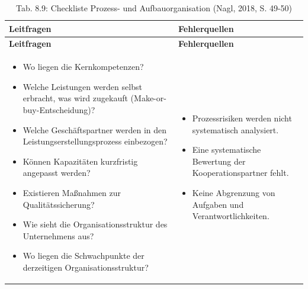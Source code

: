 \documentclass[
  letterpaper,
]{book}
\begin{document}
\begin{longtable}[]{@{}
  >{\raggedright\arraybackslash}p{}
  >{\raggedright\arraybackslash}p{}@{}}
\caption{Tab. 8.9: Checkliste Prozess- und Aufbauorganisation (Nagl,
2018, S. 49-50)}\tabularnewline
\toprule\noalign{}
\begin{minipage}[b]{\linewidth}\raggedright
\textbf{Leitfragen}
\end{minipage} & \begin{minipage}[b]{\linewidth}\raggedright
\textbf{Fehlerquellen}
\end{minipage} \\
\midrule\noalign{}
\endfirsthead
\toprule\noalign{}
\begin{minipage}[b]{\linewidth}\raggedright
\textbf{Leitfragen}
\end{minipage} & \begin{minipage}[b]{\linewidth}\raggedright
\textbf{Fehlerquellen}
\end{minipage} \\
\midrule\noalign{}
\endhead
\bottomrule\noalign{}
\endlastfoot
\begin{minipage}[t]{\linewidth}\raggedright
\begin{itemize}
\item
  Wo liegen die Kernkompetenzen?
\item
  Welche Leistungen werden selbst erbracht, was wird zugekauft
  (Make-or-buy-Entscheidung)?
\item
  Welche Geschäftspartner werden in den Leistungserstellungsprozess
  einbezogen?
\item
  Können Kapazitäten kurzfristig angepasst werden?
\item
  Existieren Maßnahmen zur Qualitätssicherung?
\item
  Wie sieht die Organisationsstruktur des Unternehmens aus?
\item
  Wo liegen die Schwachpunkte der derzeitigen Organisationsstruktur?
\end{itemize}
\end{minipage} & \begin{minipage}[t]{\linewidth}\raggedright
\begin{itemize}
\item
  Prozessrisiken werden nicht systematisch analysiert.
\item
  Eine systematische Bewertung der Kooperationspartner fehlt.
\item
  Keine Abgrenzung von Aufgaben und Verantwortlichkeiten.
\end{itemize}
\end{minipage} \\
\end{longtable}
\end{document}
